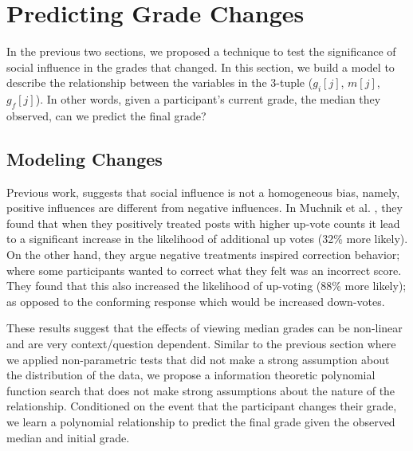 \section{Predicting Grade Changes}
\label{changemod}
In the previous two sections, we proposed a technique to test the significance of social influence in the grades that changed.
In this section, we build a model to describe the relationship between the variables in the 3-tuple ($g_i[j]$, $m[j]$, $g_f[j]$).
In other words, given a participant's current grade, the median they observed, can we predict the final grade?

\subsection{Modeling Changes}
Previous work, suggests that social influence is not a homogeneous bias, namely, positive influences are different from negative influences.
In Muchnik et al. \cite{muchnik2013social}, they found that when they positively treated posts with higher up-vote counts it lead to a significant increase in the likelihood of additional up votes (32\% more likely). 
On the other hand, they argue negative treatments inspired correction behavior; where some participants wanted to correct what they felt was an incorrect score. 
They found that this also increased the likelihood of up-voting (88\% more likely); as opposed to the conforming response which would be increased down-votes.

These results suggest that the effects of viewing median grades can be non-linear and are very context/question dependent.
Similar to the previous section where we applied non-parametric tests that did not make a strong assumption about the distribution of the data, we propose a information theoretic polynomial function search that does not make strong assumptions about the nature of the relationship.
Conditioned on the event that the participant changes their grade, we learn a polynomial relationship to predict the final grade given the observed median and initial grade.

